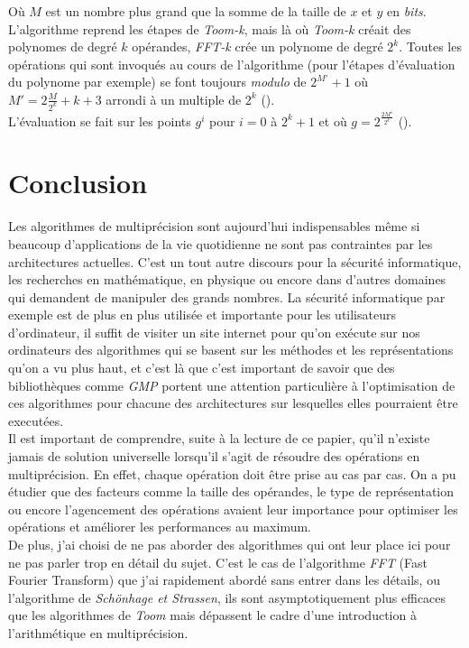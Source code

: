 \documentclass[letterpaper]{article}
\begin{document}
Où $M$ est un nombre plus grand que la somme de la taille de $x$ et $y$ en
\emph{bits}. L'algorithme reprend les étapes de \emph{Toom-k}, mais là où
\emph{Toom-k} créait des polynomes de degré $k$ opérandes, \emph{FFT-k} crée
un polynome de degré $2^{k}$. Toutes les opérations qui sont invoqués au cours
de l'algorithme (pour l'étapes d'évaluation du polynome par exemple) se font
toujours \emph{modulo} de $2^{M'} + 1$ où $M' = 2\frac{M}{2^{k}}+k+3$ arrondi à
un multiple de $2^k$ (\cite{gmplibfft}).\\

L'évaluation se fait sur les points $g^i$ pour $i = 0$ à $2^{k}+1$ et où
$g = 2^{\frac{2M'}{2^k}}$ (\cite{gmplibfft}).

\section{Conclusion}

Les algorithmes de multiprécision sont aujourd'hui indispensables même si
beaucoup d'applications de la vie quotidienne ne sont pas contraintes par les
architectures actuelles. C'est un tout autre discours pour la sécurité
informatique, les recherches en mathématique, en physique ou encore dans
d'autres domaines qui demandent de manipuler des grands nombres. La sécurité
informatique par exemple est de plus en plus utilisée et importante pour
les utilisateurs d'ordinateur, il suffit de visiter un site internet pour
qu'on exécute sur nos ordinateurs des algorithmes qui se basent sur les
méthodes et les représentations qu'on a vu plus haut, et c'est là que c'est
important de savoir que des bibliothèques comme \emph{GMP} portent une attention
particulière à l'optimisation de ces algorithmes pour chacune des architectures
sur lesquelles elles pourraient être executées.\\

Il est important de comprendre, suite à la lecture de ce papier, qu'il n'existe
jamais de solution universelle lorsqu'il s'agit de résoudre des opérations en
multiprécision. En effet, chaque opération doit être prise au cas par
cas. On a pu étudier que des facteurs comme la taille des opérandes, le type de
représentation ou encore l'agencement des opérations avaient leur importance
pour optimiser les opérations et améliorer les performances au maximum.\\

De plus, j'ai choisi de ne pas aborder des algorithmes qui ont leur place
ici pour ne pas parler trop en détail du sujet. C'est le cas de l'algorithme
\emph{FFT} (Fast Fourier Transform) que j'ai rapidement abordé sans entrer dans
les détails, ou l'algorithme de \emph{Schönhage et Strassen}, ils
sont asymptotiquement plus efficaces que les algorithmes de \emph{Toom} mais
dépassent le cadre d'une introduction à l'arithmétique en multiprécision.\\
\end{document}
